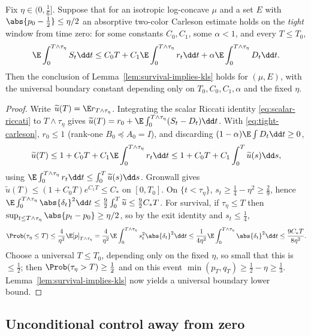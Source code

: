 \documentclass[../../main.tex]{subfiles}
\begin{document}
\begin{corollary}
\label{cor:tight-window-consumption}
Fix $\eta\in(0,\tfrac16]$. Suppose that for an isotropic log-concave $\mu$ and a set $E$ with
$\abs{p_0-\tfrac12}\le\eta/2$ an absorptive two-color Carleson estimate holds on the
\emph{tight} window from time zero: for some constants $C_0,C_1$, some $\alpha<1$, and every
$T\le T_0$,
\begin{equation}\label{eq:tight-carleson}
  \E\int_0^{T\wedge\tau_\eta}S_t\dd t
  \le C_0T+C_1\E\int_0^{T\wedge\tau_\eta}r_t\dd t
  +\alpha\E\int_0^{T\wedge\tau_\eta}D_t\dd t .
\end{equation}
Then the conclusion of Lemma~\ref{lem:survival-implies-kls} holds for $(\mu,E)$, with the
universal boundary constant depending only on $T_0,C_0,C_1,\alpha$ and the fixed $\eta$.
\end{corollary}

\begin{proof}
Write $\widetilde u(T)=\E r_{T\wedge\tau_\eta}$. Integrating the scalar Riccati identity
\eqref{eq:scalar-riccati} to $T\wedge\tau_\eta$ gives
$\widetilde u(T)=r_0+\E\int_0^{T\wedge\tau_\eta}(S_t-D_t)\dd t$. With \eqref{eq:tight-carleson},
$r_0\le1$ (rank-one $B_0\preceq A_0=I$), and discarding $(1-\alpha)\E\int D_t\dd t\ge0$,
\[
  \widetilde u(T)\le 1+C_0T+C_1\E\int_0^{T\wedge\tau_\eta}r_t\dd t
  \le 1+C_0T+C_1\int_0^T\widetilde u(s)\dd s ,
\]
using $\E\int_0^{T\wedge\tau_\eta}r_t\dd t\le\int_0^T\widetilde u(s)\dd s$. Gronwall gives
$\widetilde u(T)\le(1+C_0T)e^{C_1T}\le C_*$ on $[0,T_0]$. On $\{t<\tau_\eta\}$,
$s_t\ge\tfrac14-\eta^2\ge\tfrac29$, hence
$\E\int_0^{T\wedge\tau_\eta}\abs{\delta_t}^2\dd t\le\tfrac92\int_0^T\widetilde u\le\tfrac92C_*T$.
For survival, if $\tau_\eta\le T$ then $\sup_{t\le T\wedge\tau_\eta}\abs{p_t-p_0}\ge\eta/2$, so by
the exit identity and $s_t\le\tfrac14$,
\[
  \Prob(\tau_\eta\le T)\le\frac4{\eta^2}\E[p]_{T\wedge\tau_\eta}
  =\frac4{\eta^2}\E\int_0^{T\wedge\tau_\eta}s_t^2\abs{\delta_t}^2\dd t
  \le\frac1{4\eta^2}\E\int_0^{T\wedge\tau_\eta}\abs{\delta_t}^2\dd t
  \le\frac{9C_*T}{8\eta^2}.
\]
Choose a universal $T\le T_0$, depending only on the fixed $\eta$, so small that this is
$\le\tfrac12$; then $\Prob(\tau_\eta>T)\ge\tfrac12$ and on this event
$\min(p_T,q_T)\ge\tfrac12-\eta\ge\tfrac13$. Lemma~\ref{lem:survival-implies-kls} now yields a
universal boundary lower bound.
\end{proof}

\subsection{Unconditional control away from zero}
\end{document}
